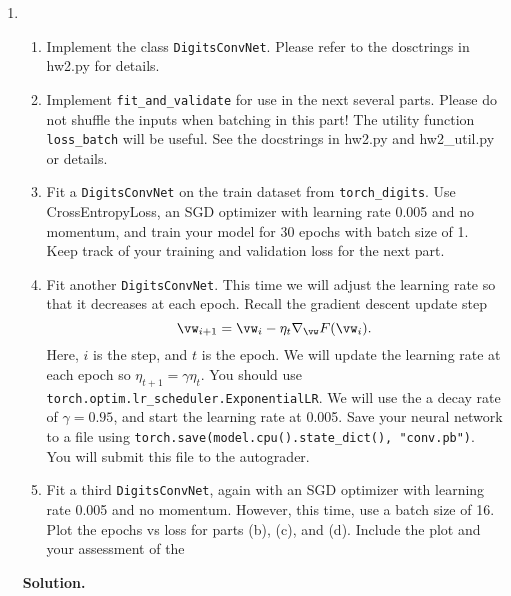 \documentclass{article}
\theoremstyle{definition}
\theoremstyle{remark}
\newenvironment{Q}
        {%
            \clearpage
        \item
            }
        {%
            \phantom{s}
          \bigskip
          \textbf{Solution.}
        }
\begin{document}
\begin{enumerate}
\begin{Q}
                    \begin{enumerate}
                        \item Implement the class \texttt{DigitsConvNet}.  Please refer to the dosctrings in hw2.py for details.
                        \item Implement \texttt{fit\_and\_validate} for use in
                            the next several parts.  Please do not shuffle the
                            inputs when batching in this part!  The utility
                            function \texttt{loss\_batch} will be useful. See
                            the docstrings in hw2.py and hw2\_util.py or details.
                        \item Fit a \texttt{DigitsConvNet} on the train dataset
                            from \texttt{torch\_digits}.  Use CrossEntropyLoss,
                            an SGD optimizer with learning rate 0.005 and no
                            momentum, and train your model for 30 epochs with
                            batch size of 1.  Keep track of your training and
                            validation loss for the next part.
                        \item Fit another \texttt{DigitsConvNet}.  This time we
                            will adjust the learning rate so that it decreases
                            at each epoch.  Recall the gradient descent update step
                            $$\vw_{i+1} = \vw_i - \eta_t \nabla_{\vw} F(\vw_i).$$
                            Here, $i$ is the step, and $t$ is the epoch.
                            We will update the learning rate at each epoch so
                            $\eta_{t+1} = \gamma \eta_t$.  You should use
                            \texttt{torch.optim.lr\_scheduler.ExponentialLR}.  We
                            will use the a decay rate of $\gamma=0.95$, and
                            start the learning rate at 0.005.  Save your neural
                            network to a file using
                            \texttt{torch.save(model.cpu().state\_dict(),
                            "conv.pb")}.  You will submit this file to the
                            autograder.
                        \item Fit a third \texttt{DigitsConvNet}, again with an
                            SGD optimizer with learning rate 0.005 and no
                            momentum.  However, this time, use a batch size of
                            16. Plot the epochs vs loss for parts (b), (c), and
                            (d).  Include the plot and your assessment of the

\end{enumerate}
\end{Q}
\end{enumerate}
\end{document}
